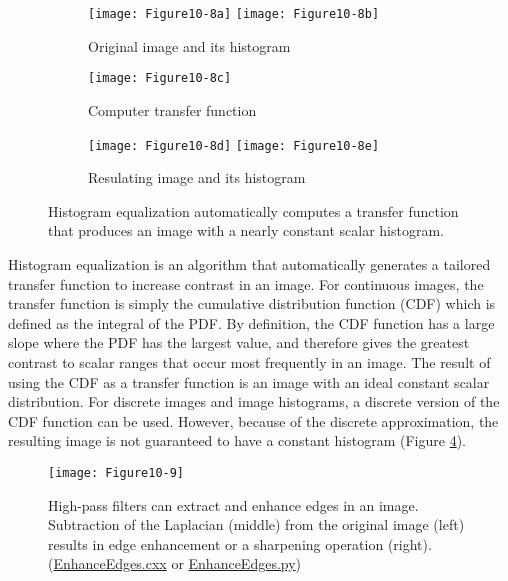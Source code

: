 \begin{figure}[htb]
	\begin{subfigure}[h]{0.96\linewidth}
		\texttt{[image: Figure10-8a]}
		\texttt{[image: Figure10-8b]}
		\captionsetup{justification=centering}
		\caption*{Original image and its histogram}
		\label{fig:Figure10-8a}
	\end{subfigure}
	\hfill

	\begin{subfigure}[h]{0.48\linewidth}
		\texttt{[image: Figure10-8c]}
		\captionsetup{justification=centering}
		\caption*{Computer transfer function}
		\label{fig:Figure10-8c}
	\end{subfigure}

	\hfill
	\begin{subfigure}[h]{0.96\linewidth}
		\texttt{[image: Figure10-8d]}
		\texttt{[image: Figure10-8e]}
		\captionsetup{justification=centering}
		\caption*{Resulating image and its histogram}
		\label{fig:Figure10-8d}
	\end{subfigure}
	\caption{Histogram equalization automatically computes a transfer function that produces an image with a nearly constant scalar histogram.}\label{fig:Figure10-8}
\end{figure}

Histogram equalization is an algorithm that automatically generates a tailored transfer function to increase contrast in an image. For continuous images, the transfer function is simply the cumulative distribution function (CDF) which is defined as the integral of the PDF. By definition, the CDF function has a large slope where the PDF has the largest value, and therefore gives the greatest contrast to scalar ranges that occur most frequently in an image. The result of using the CDF as a transfer function is an image with an ideal constant scalar distribution. For discrete images and image histograms, a discrete version of the CDF function can be used. However, because of the discrete approximation, the resulting image is not guaranteed to have a constant histogram (Figure \ref{fig:Figure10-8}).

\begin{figure}[!htb]
	\centering
	\texttt{[image: Figure10-9]}
	\caption{High-pass filters can extract and enhance edges in an image. Subtraction of the Laplacian (middle) from the original image (left) results in edge enhancement or a sharpening operation (right). (\href{https://lorensen.github.io/VTKExamples/site/Cxx/ImageProcessing/EnhanceEdges/}{EnhanceEdges.cxx} or \href{https://lorensen.github.io/VTKExamples/site/Python/ImageProcessing/EnhanceEdges/}{EnhanceEdges.py})}
	\label{fig:Figure10-9}
\end{figure}

